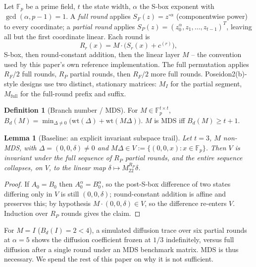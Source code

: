 \documentclass[conference]{IEEEtran}
\theoremstyle{definition}
\newtheorem{definition}{Definition}
\theoremstyle{plain}
\newtheorem{lemma}{Lemma}
\begin{document}
Let $\mathbb F_p$ be a prime field, $t$ the state width, $\alpha$ the
S-box exponent with $\gcd(\alpha,p-1)=1$. A \emph{full round} applies
$S_F(z)=z^{\circ\alpha}$ (componentwise power) to every coordinate; a
\emph{partial round} applies $S_P(z)=(z_0^{\alpha},z_1,\ldots,z_{t-1})^T$,
leaving all but the first coordinate linear. Each round is
\[
  R_r(x) = M\cdot\big(S_r(x) + c^{(r)}\big),
\]
S-box, then round-constant addition, then the linear layer $M$ -- the
convention used by this paper's own reference implementation. The full
permutation applies $R_F/2$ full rounds, $R_P$ partial rounds, then
$R_F/2$ more full rounds. Poseidon2(b)-style designs use two distinct,
stationary matrices: $M_I$ for the partial segment, $M_{\mathrm{full}}$
for the full-round prefix and suffix.

\begin{definition}[Branch number / MDS]
For $M\in\mathbb F_p^{t\times t}$,
$B_d(M)=\min_{\Delta\ne0}\big(\mathrm{wt}(\Delta)+\mathrm{wt}(M\Delta)\big)$.
$M$ is MDS iff $B_d(M)\ge t+1$.
\end{definition}

\begin{lemma}[Baseline: an explicit invariant subspace trail]
\label{lem:invariant-subspace}
Let $t=3$, $M$ non-MDS, with $\Delta=(0,0,\delta)\ne0$ and
$M\Delta \in V:=\{(0,0,x):x\in\mathbb F_p\}$. Then $V$ is invariant under
the full sequence of $R_P$ partial rounds, and the entire sequence
collapses, on $V$, to the linear map $\delta\mapsto M_{22}^{R_P}\delta$.
\end{lemma}
\begin{proof}
If $A_0=B_0$ then $A_0^{\alpha}=B_0^{\alpha}$, so the post-S-box
difference of two states differing only in $V$ is still $(0,0,\delta)$;
round-constant addition is affine and preserves this; by hypothesis
$M\cdot(0,0,\delta)\in V$, so the difference re-enters $V$. Induction
over $R_P$ rounds gives the claim.
\end{proof}

For $M=I$ ($B_d(I)=2<4$), a simulated diffusion trace over six partial
rounds at $\alpha=5$ shows the diffusion coefficient frozen at $1/3$
indefinitely, versus full diffusion after a single round under an MDS
benchmark matrix. MDS is thus necessary. We spend the rest of this paper
on why it is not sufficient.
\end{document}
